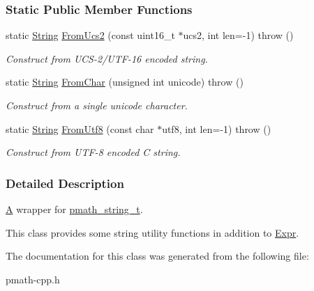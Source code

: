 \subsubsection*{Static Public Member Functions}
\begin{CompactItemize}
\item 
\hypertarget{classpmath_1_1_string_8010a9b5667091e2617e4471cb46cfab}{
static \hyperlink{classpmath_1_1_string}{String} \hyperlink{classpmath_1_1_string_8010a9b5667091e2617e4471cb46cfab}{FromUcs2} (const uint16\_\-t $\ast$ucs2, int len=-1)  throw ()}
\label{classpmath_1_1_string_8010a9b5667091e2617e4471cb46cfab}

\begin{CompactList}\small\item\em Construct from UCS-2/UTF-16 encoded string. \item\end{CompactList}\item 
\hypertarget{classpmath_1_1_string_7f0cdb2834581c15c490e66b766334f5}{
static \hyperlink{classpmath_1_1_string}{String} \hyperlink{classpmath_1_1_string_7f0cdb2834581c15c490e66b766334f5}{FromChar} (unsigned int unicode)  throw ()}
\label{classpmath_1_1_string_7f0cdb2834581c15c490e66b766334f5}

\begin{CompactList}\small\item\em Construct from a single unicode character. \item\end{CompactList}\item 
\hypertarget{classpmath_1_1_string_aec750641607be2190b98a7c5caeaba0}{
static \hyperlink{classpmath_1_1_string}{String} \hyperlink{classpmath_1_1_string_aec750641607be2190b98a7c5caeaba0}{FromUtf8} (const char $\ast$utf8, int len=-1)  throw ()}
\label{classpmath_1_1_string_aec750641607be2190b98a7c5caeaba0}

\begin{CompactList}\small\item\em Construct from UTF-8 encoded C string. \item\end{CompactList}\end{CompactItemize}


\subsubsection{Detailed Description}
\hyperlink{class_a}{A} wrapper for \hyperlink{classpmath__string__t}{pmath\_\-string\_\-t}.

This class provides some string utility functions in addition to \hyperlink{classpmath_1_1_expr}{Expr}. 

The documentation for this class was generated from the following file:\begin{CompactItemize}
\item 
pmath-cpp.h\end{CompactItemize}
